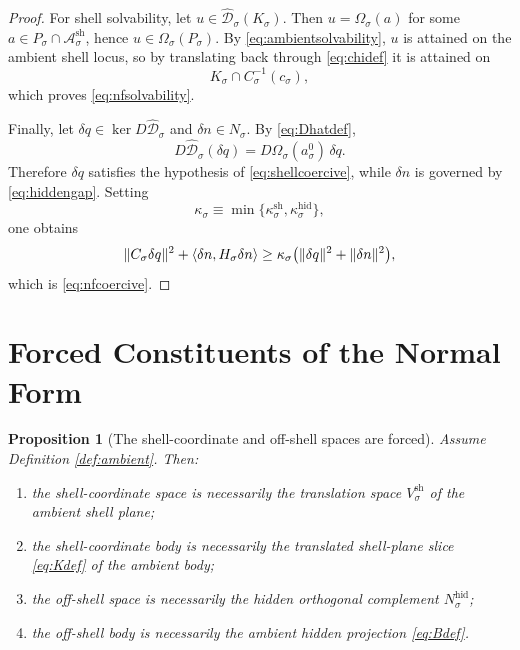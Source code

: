 \documentclass[11pt]{article}
\newcommand{\CoordBody}[1]{K_{#1}}
\newcommand{\NormalSpace}[1]{N_{#1}}
\newcommand{\AffineData}[1]{\widehat{\mathcal D}_{#1}}
\newcommand{\ConstraintMap}[1]{C_{#1}}
\newcommand{\ConstraintValue}[1]{c_{#1}}
\newcommand{\NormalOperator}[1]{H_{#1}}
\newcommand{\AmbientBody}[1]{P_{#1}}
\newcommand{\AmbientRead}[1]{\Omega_{#1}}
\newcommand{\ShellAffine}[1]{\mathcal A_{#1}^{\mathrm{sh}}}
\newcommand{\ShellVector}[1]{V_{#1}^{\mathrm{sh}}}
\newcommand{\HiddenSpace}[1]{N_{#1}^{\mathrm{hid}}}
\newcommand{\AmbientRef}[1]{a_{#1}^{0}}
\newtheorem{proposition}{Proposition}
\begin{document}
\begin{proof}
For shell solvability, let \(u\in \AffineData{\sigma}(\CoordBody{\sigma})\). Then \(u=\AmbientRead{\sigma}(a)\) for some \(a\in\AmbientBody{\sigma}\cap\ShellAffine{\sigma}\), hence \(u\in\AmbientRead{\sigma}(\AmbientBody{\sigma})\). By \eqref{eq:ambientsolvability}, \(u\) is attained on the ambient shell locus, so by translating back through \eqref{eq:chidef} it is attained on
\[
\CoordBody{\sigma}\cap\ConstraintMap{\sigma}^{-1}(\ConstraintValue{\sigma}),
\]
which proves \eqref{eq:nfsolvability}.

Finally, let \(\delta q\in\ker D\AffineData{\sigma}\) and \(\delta n\in\NormalSpace{\sigma}\). By \eqref{eq:Dhatdef},
\[
D\AffineData{\sigma}(\delta q)
=
D\AmbientRead{\sigma}(\AmbientRef{\sigma})\,\delta q.
\]
Therefore \(\delta q\) satisfies the hypothesis of \eqref{eq:shellcoercive}, while \(\delta n\) is governed by \eqref{eq:hiddengap}. Setting
\[
\kappa_{\sigma}\equiv
\min\{
\kappa_{\sigma}^{\mathrm{sh}},
\kappa_{\sigma}^{\mathrm{hid}}
\},
\]
one obtains
\[
\|\ConstraintMap{\sigma}\delta q\|^{2}
+
\ev{\delta n,\NormalOperator{\sigma}\delta n}
\ge
\kappa_{\sigma}
\bigl(
\|\delta q\|^{2}+\|\delta n\|^{2}
\bigr),
\]
which is \eqref{eq:nfcoercive}.
\end{proof}

\section{Forced Constituents of the Normal Form}

\begin{proposition}[The shell-coordinate and off-shell spaces are forced]
\label{prop:spaces}
Assume Definition \ref{def:ambient}. Then:
\begin{enumerate}
    \item the shell-coordinate space is necessarily the translation space \(\ShellVector{\sigma}\) of the ambient shell plane;
    \item the shell-coordinate body is necessarily the translated shell-plane slice \eqref{eq:Kdef} of the ambient body;
    \item the off-shell space is necessarily the hidden orthogonal complement \(\HiddenSpace{\sigma}\);
    \item the off-shell body is necessarily the ambient hidden projection \eqref{eq:Bdef}.
\end{enumerate}
\end{proposition}
\end{document}
